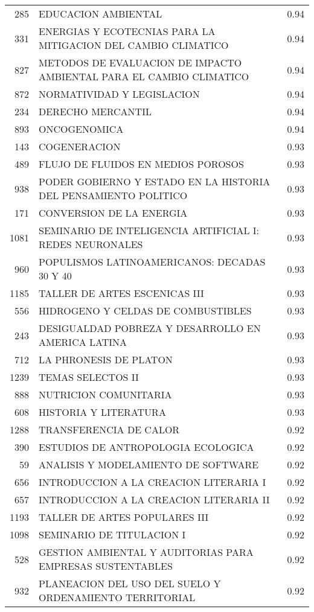 \documentclass[12pt]{article}
\begin{document}
\begin{table}[ht]
\begin{tabular}{rlr}
  285 & EDUCACION AMBIENTAL & 0.94 \\ 
  331 & ENERGIAS Y ECOTECNIAS PARA LA MITIGACION DEL CAMBIO CLIMATICO & 0.94 \\ 
  827 & METODOS DE EVALUACION DE IMPACTO AMBIENTAL PARA EL CAMBIO CLIMATICO & 0.94 \\ 
  872 & NORMATIVIDAD Y LEGISLACION & 0.94 \\ 
  234 & DERECHO MERCANTIL & 0.94 \\ 
  893 & ONCOGENOMICA & 0.94 \\ 
  143 & COGENERACION & 0.93 \\ 
  489 & FLUJO DE FLUIDOS EN MEDIOS POROSOS & 0.93 \\ 
  938 & PODER GOBIERNO Y ESTADO EN LA HISTORIA DEL PENSAMIENTO POLITICO & 0.93 \\ 
  171 & CONVERSION DE LA ENERGIA & 0.93 \\ 
  1081 & SEMINARIO DE INTELIGENCIA ARTIFICIAL I: REDES NEURONALES & 0.93 \\ 
  960 & POPULISMOS LATINOAMERICANOS: DECADAS 30 Y 40 & 0.93 \\ 
  1185 & TALLER DE ARTES ESCENICAS III & 0.93 \\ 
  556 & HIDROGENO Y CELDAS DE COMBUSTIBLES & 0.93 \\ 
  243 & DESIGUALDAD POBREZA Y DESARROLLO EN AMERICA LATINA & 0.93 \\ 
  712 & LA PHRONESIS DE PLATON & 0.93 \\ 
  1239 & TEMAS SELECTOS II & 0.93 \\ 
  888 & NUTRICION COMUNITARIA & 0.93 \\ 
  608 & HISTORIA Y LITERATURA & 0.93 \\ 
  1288 & TRANSFERENCIA DE CALOR & 0.92 \\ 
  390 & ESTUDIOS DE ANTROPOLOGIA ECOLOGICA & 0.92 \\ 
  59 & ANALISIS Y MODELAMIENTO DE SOFTWARE & 0.92 \\ 
  656 & INTRODUCCION A LA CREACION LITERARIA I & 0.92 \\ 
  657 & INTRODUCCION A LA CREACION LITERARIA II & 0.92 \\ 
  1193 & TALLER DE ARTES POPULARES III & 0.92 \\ 
  1098 & SEMINARIO DE TITULACION I & 0.92 \\ 
  528 & GESTION AMBIENTAL Y AUDITORIAS PARA EMPRESAS SUSTENTABLES & 0.92 \\ 
  932 & PLANEACION DEL USO DEL SUELO Y ORDENAMIENTO TERRITORIAL & 0.92 \\ 

\end{tabular}
\end{table}
\end{document}
